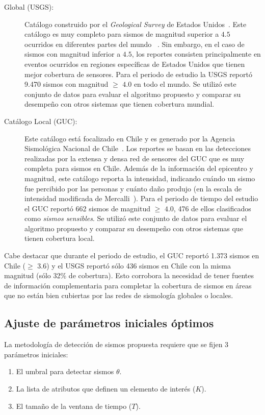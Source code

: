 \begin{description}
\item[Global (USGS):] 
		Catálogo construido por el \textit{Geological Survey} de Estados Unidos~\cite{usgs:data}. Este catálogo es muy completo para sismos de magnitud superior a $4.5$ ocurridos en diferentes partes del mundo ~\cite{earle2010omg}. Sin embargo, en el caso de sismos con magnitud inferior a $4.5$, los reportes consisten principalmente en eventos ocurridos en regiones específicas de Estados Unidos que tienen mejor cobertura de sensores. Para el periodo de estudio la USGS reportó 9.470 sismos con magnitud $\geq$ $4.0$ en todo el mundo. Se utilizó este conjunto de datos para evaluar el algoritmo propuesto y comparar su desempeño con otros sistemas que tienen cobertura mundial.

\item[Catálogo Local (GUC):]
		Este catálogo está focalizado en Chile y es generado por la Agencia Sismológica Nacional de Chile~\cite{guc:data}. Los reportes se basan en las detecciones realizadas por la extensa y densa red de sensores del GUC que es muy completa para sismos en Chile. Además de la información del epicentro y magnitud, este catálogo reporta la intensidad, indicando cuándo un sismo fue percibido por las personas y cuánto daño produjo (en la escala de intensidad modificada de Mercalli~\cite{usgs:mercalli}).
		Para el periodo de tiempo del estudio el GUC reportó 662 sismos de magnitud $\geq$ $4.0$, 476 de ellos clasificados como \textit{sismos sensibles}. Se utilizó este conjunto de datos para evaluar el algoritmo propuesto y comparar su desempeño con otros sistemas que tienen cobertura local. 
		
\end{description}
		
		Cabe destacar que durante el periodo de estudio, el GUC reportó 1.373 sismos en Chile ($\geq$ $3.6$) y el USGS reportó sólo 436 sismos en Chile con la misma magnitud (sólo 32\% de cobertura). Esto corrobora la necesidad de tener fuentes de información complementaria para completar la cobertura de sismos en áreas que no están bien cubiertas por las redes de sismología globales o locales. 
		
	\subsection{Ajuste de parámetros iniciales óptimos}

	La metodología de detección de sismos propuesta requiere que se fijen 3 parámetros iniciales:
	\begin{enumerate}
		\item El umbral para detectar sismos $\theta$.
		\item La lista de atributos que definen un elemento de interés ($K$).
		\item El tamaño de la ventana de tiempo ($T$).
	\end{enumerate}
	
